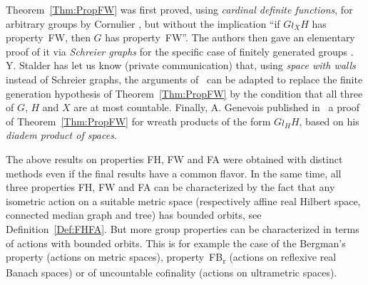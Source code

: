 \documentclass[a4paper]{article}
\theoremstyle{definition}
\newcommand*{\FB}{FB\textsubscript{r}}
\newcommand*{\FH}{FH}
\newcommand*{\FW}{FW}
\newcommand*{\FA}{FA}
\begin{document}
Theorem~\ref{Thm:PropFW} was first proved, using \emph{cardinal definite functions}, for arbitrary groups by Cornulier \cite[Propositions 5.B.3 and 5.B.4]{Cornulier2013}, but without the implication ``if $G \wr_X H$ has property~\FW, then $G$ has property~\FW''.
The authors then gave an elementary proof of it via \emph{Schreier graphs} for the specific case of finitely generated groups \cite{LS2020}.
Y. Stalder has let us know (private communication) that, using \emph{space with walls} instead of Schreier graphs, the arguments of~\cite{LS2020} can be adapted to replace the finite generation hypothesis of Theorem~\ref{Thm:PropFW} by the condition that all three of $G$, $H$ and $X$ are at most countable.
Finally, A. Genevois published in~\cite{2017arXiv170500834G} a proof of Theorem~\ref{Thm:PropFW} for wreath products of the form $G\wr_HH$, based on his \emph{diadem product of spaces}.

The above results on properties \FH, \FW{} and \FA{} were obtained with distinct methods even if the final results have a common flavor.
In the same time, all three properties \FH, \FW{}  and \FA{} can be characterized by the fact that any isometric action on a suitable metric space (respectively affine real Hilbert space, connected median graph and tree) has bounded orbits, see Definition~\ref{Def:FHFA}.
But more group properties can be characterized in terms of actions with bounded orbits.
This is for example the case of the Bergman's property (actions on metric spaces), property~\FB{} (actions on reflexive real Banach spaces) or of uncountable cofinality (actions on ultrametric spaces).
\end{document}

